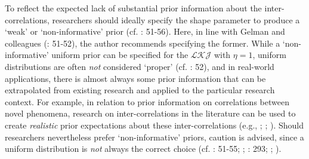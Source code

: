\documentclass[
  10pt,
  a4paper,
  twoside]{article}
\begin{document}
To reflect the expected lack of substantial prior information about the inter-correlations, researchers should ideally specify the shape parameter to produce a `weak' or `non-informative' prior (cf. : 51-56). Here, in line with Gelman and colleagues (: 51-52), the author recommends specifying the former. While a `non-informative' uniform prior can be specified for the \(\mathcal{LKJ}\) with \(\eta = 1\), uniform distributions are often \emph{not} considered `proper' (cf. : 52), and in real-world applications, there is almost always some prior information that can be extrapolated from existing research and applied to the particular research context. For example, in relation to prior information on correlations between novel phenomena, research on inter-correlations in the literature can be used to create \emph{realistic} prior expectations about these inter-correlations (e.g., ; ; ). Should researchers nevertheless prefer `non-informative' priors, caution is advised, since a uniform distribution is \emph{not} always the correct choice (cf. : 51-55; ; : 293; ; ).
\end{document}
